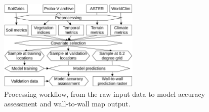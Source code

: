 \documentclass[review,authoryear,3p]{elsarticle}
\begin{document}
\begin{figure}
 \centering
 \includegraphics[width=0.6\textwidth]{article-figures/flowcharts/2020-07-10-flowchart}
 \caption{Processing workflow, from the raw input data to model accuracy assessment and wall-to-wall map output.}
 \label{fig-processing}
\end{figure}


\label{sec-temporal-filter}
\end{document}
